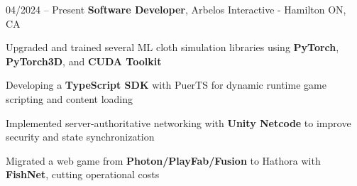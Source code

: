 \begin{twocolentry}{
    04/2024 – Present
}
\fontsize{11 pt}{11 pt}\textbf{Software Developer}, Arbelos Interactive - Hamilton ON, CA \end{twocolentry}

\vspace{0.10 cm}
\begin{onecolentry}
   \begin{highlights}
       \item Upgraded and trained several ML cloth simulation libraries using \textbf{PyTorch}, \textbf{PyTorch3D}, and \textbf{CUDA Toolkit}
       \item Developing a \textbf{TypeScript SDK} with PuerTS for dynamic runtime game scripting and content loading
       \item Implemented server-authoritative networking with \textbf{Unity Netcode} to improve security and state synchronization
       \item Migrated a web game from \textbf{Photon/PlayFab/Fusion} to Hathora with \textbf{FishNet}, cutting operational costs
   \end{highlights}
\end{onecolentry}
